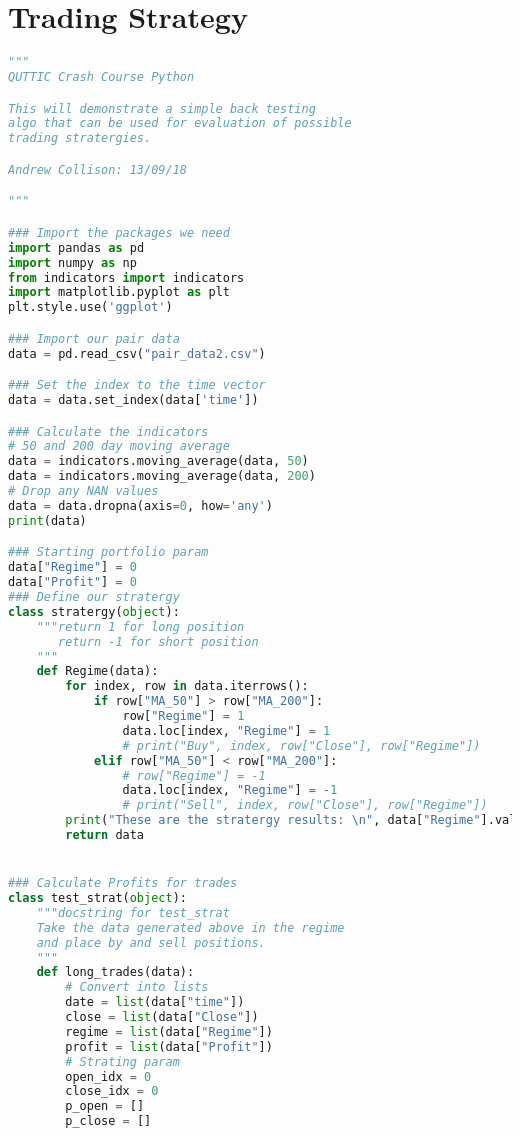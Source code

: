 \documentclass[11pt]{report}
\begin{document}
\section{Trading Strategy}
\begin{lstlisting}[language = python]
"""
QUTTIC Crash Course Python

This will demonstrate a simple back testing
algo that can be used for evaluation of possible
trading stratergies.

Andrew Collison: 13/09/18

"""

### Import the packages we need
import pandas as pd
import numpy as np
from indicators import indicators
import matplotlib.pyplot as plt
plt.style.use('ggplot')

### Import our pair data 
data = pd.read_csv("pair_data2.csv")

### Set the index to the time vector
data = data.set_index(data['time'])

### Calculate the indicators
# 50 and 200 day moving average
data = indicators.moving_average(data, 50) 
data = indicators.moving_average(data, 200)
# Drop any NAN values
data = data.dropna(axis=0, how='any')
print(data)

### Starting portfolio param
data["Regime"] = 0
data["Profit"] = 0
### Define our stratergy
class stratergy(object):
    """return 1 for long position
       return -1 for short position
    """
    def Regime(data):
        for index, row in data.iterrows():
            if row["MA_50"] > row["MA_200"]:
                row["Regime"] = 1
                data.loc[index, "Regime"] = 1
                # print("Buy", index, row["Close"], row["Regime"])
            elif row["MA_50"] < row["MA_200"]:
                # row["Regime"] = -1
                data.loc[index, "Regime"] = -1
                # print("Sell", index, row["Close"], row["Regime"])
        print("These are the stratergy results: \n", data["Regime"].value_counts())             
        return data


### Calculate Profits for trades
class test_strat(object):
    """docstring for test_strat
    Take the data generated above in the regime
    and place by and sell positions.
    """
    def long_trades(data):
        # Convert into lists
        date = list(data["time"])
        close = list(data["Close"])
        regime = list(data["Regime"])
        profit = list(data["Profit"])
        # Strating param
        open_idx = 0
        close_idx = 0
        p_open = []
        p_close = []


\end{lstlisting}
\end{document}
